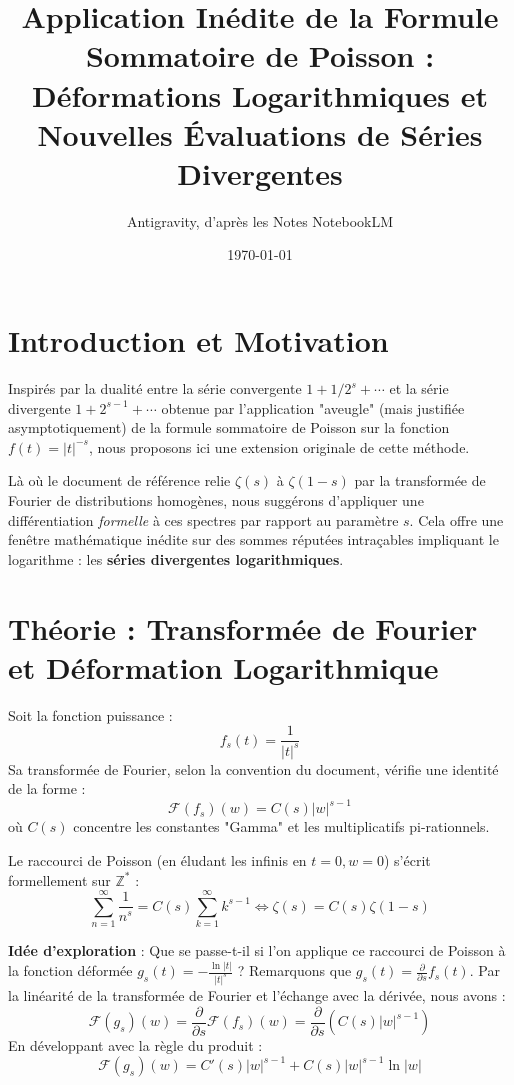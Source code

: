\documentclass[12pt,a4paper]{article}
\title{Application Inédite de la Formule Sommatoire de Poisson : \\
\large Déformations Logarithmiques et Nouvelles Évaluations de Séries Divergentes}
\author{Antigravity, d'après les Notes NotebookLM}
\date{\today}
\begin{document}
\maketitle

\section{Introduction et Motivation}
Inspirés par la dualité entre la série convergente $1+1/2^s+\cdots$ et la série divergente $1+2^{s-1}+\cdots$ obtenue par l'application "aveugle" (mais justifiée asymptotiquement) de la formule sommatoire de Poisson sur la fonction $f(t) = |t|^{-s}$, nous proposons ici une extension originale de cette méthode.

Là où le document de référence relie $\zeta(s)$ à $\zeta(1-s)$ par la transformée de Fourier de distributions homogènes, nous suggérons d'appliquer une différentiation \textit{formelle} à ces spectres par rapport au paramètre $s$. Cela offre une fenêtre mathématique inédite sur des sommes réputées intraçables impliquant le logarithme : les \textbf{séries divergentes logarithmiques}.

\section{Théorie : Transformée de Fourier et Déformation Logarithmique}
Soit la fonction puissance :
\begin{equation}
    f_s(t) = \frac{1}{|t|^s}
\end{equation}
Sa transformée de Fourier, selon la convention du document, vérifie une identité de la forme :
\begin{equation}
    \mathcal{F}\left(f_s\right)(w) = C(s) |w|^{s-1}
\end{equation}
où $C(s)$ concentre les constantes "Gamma" et les multiplicatifs pi-rationnels.

Le raccourci de Poisson (en éludant les infinis en $t=0, w=0$) s'écrit formellement sur $\mathbb{Z}^*$ :
\begin{equation}
    \sum_{n=1}^\infty \frac{1}{n^s} = C(s) \sum_{k=1}^\infty k^{s-1} \iff \zeta(s) = C(s) \zeta(1-s)
\end{equation}

\textbf{Idée d'exploration} : Que se passe-t-il si l'on applique ce raccourci de Poisson à la fonction déformée $g_s(t) = -\frac{\ln|t|}{|t|^s}$ ?
Remarquons que $g_s(t) = \frac{\partial}{\partial s} f_s(t)$. Par la linéarité de la transformée de Fourier et l'échange avec la dérivée, nous avons :
\begin{equation} \label{eq:fourier_deriv}
    \mathcal{F}(g_s)(w) = \frac{\partial}{\partial s} \mathcal{F}(f_s)(w) = \frac{\partial}{\partial s} \left( C(s) |w|^{s-1} \right)
\end{equation}
En développant avec la règle du produit :
\begin{equation} \label{eq:fourier_dev}
    \mathcal{F}(g_s)(w) = C'(s) |w|^{s-1} + C(s) |w|^{s-1} \ln|w|
\end{equation}
\end{document}

